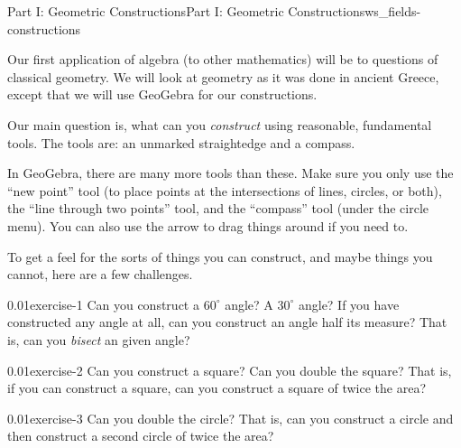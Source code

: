 \documentclass[oneside,11pt,]{article}
\title{}
\date{}
\begin{document}
%
%
\typeout{************************************************}
\typeout{************************************************}
%
\begin{worksheet-section-numberless}{Part I: Geometric Constructions}{}{Part I: Geometric Constructions}{}{}{ws_fields-constructions}
\begin{introduction}{}%
\hypertarget{p-1}{}%
Our first application of algebra (to other mathematics) will be to questions of classical geometry.  We will look at geometry as it was done in ancient Greece, except that we will use GeoGebra for our constructions.%
\par
\hypertarget{p-2}{}%
Our main question is, what can you \emph{construct} using reasonable, fundamental tools.  The tools are: an unmarked straightedge and a compass.%
\par
\hypertarget{p-3}{}%
In GeoGebra, there are many more tools than these. Make sure you only use the ``new point'' tool (to place points at the intersections of lines, circles, or both), the ``line through two points'' tool, and the ``compass'' tool (under the circle menu).  You can also use the arrow to drag things around if you need to.%
\par
\hypertarget{p-4}{}%
To get a feel for the sorts of things you can construct, and maybe things you cannot, here are a few challenges.%
\end{introduction}%
\begin{divisionexercise}{1}{}{0.01}{exercise-1}%
\hypertarget{p-5}{}%
Can you construct a \(60^\circ\) angle?  A \(30^\circ\) angle?  If you have constructed any angle at all, can you construct an angle half its measure?  That is, can you \emph{bisect} an given angle?%
\end{divisionexercise}%
\begin{divisionexercise}{2}{}{0.01}{exercise-2}%
\hypertarget{p-8}{}%
Can you construct a square?  Can you double the square?  That is, if you can construct a square, can you construct a square of twice the area?%
\end{divisionexercise}%
\begin{divisionexercise}{3}{}{0.01}{exercise-3}%
\hypertarget{p-11}{}%
Can you double the circle?  That is, can you construct a circle and then construct a second circle of twice the area?%
\end{divisionexercise}%

\end{worksheet-section-numberless}
\end{document}
